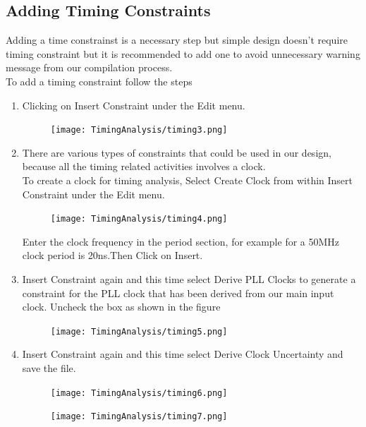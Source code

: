 \documentclass[12pt,singleside,a4paper]{article}
\begin{document}
\subsection{Adding Timing Constraints}
Adding a time constrainst is a necessary step but simple design doesn't require timing constraint but it is recommended to add one to avoid unnecessary warning message from our compilation process.
\\
To add a timing constraint follow the steps
\begin{enumerate}
    \item Clicking on Insert Constraint under the Edit menu.
    \begin{figure}[H]
            \centering
            \texttt{[image: TimingAnalysis/timing3.png]}
        \end{figure}
        
      \item There are various types of constraints that could be used in our design, because all the timing related activities involves a clock.\\
      To create a clock for timing analysis, Select Create Clock from within Insert Constraint ​under the Edit menu.
      \begin{figure}[H]
            \centering
            \texttt{[image: TimingAnalysis/timing4.png]}
        \end{figure}
        
        Enter the clock frequency in the period section, for example for a 50MHz clock period is 20ns.Then Click on Insert.
        
        \item Insert Constraint again and this time select Derive PLL Clocks to generate a constraint for the PLL clock that has been derived from our main input clock. Uncheck the box as shown in the figure
        \begin{figure}[H]
            \centering
            \texttt{[image: TimingAnalysis/timing5.png]}
        \end{figure}
        
        
        \item Insert Constraint again and this time select Derive Clock Uncertainty and save the file. 
​       \begin{figure}[H]
            \centering
            \texttt{[image: TimingAnalysis/timing6.png]}
        \end{figure}
        \begin{figure}[H]
            \centering
            \texttt{[image: TimingAnalysis/timing7.png]}
        \end{figure}
    
\end{enumerate}
\end{document}
